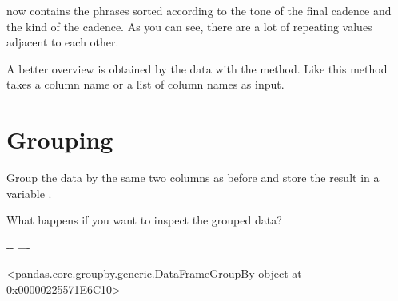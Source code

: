 \documentclass[letterpaper,10pt,english]{sphinxmanual}
\newlength\nbsphinxcodecellspacing
\begin{document}
 now contains the phrases sorted according to the tone of the final cadence and the kind of the cadence. As you can see, there are a lot of repeating values adjacent to each other.

A better overview is obtained by  the data with the  method. Like  this method takes a column name or a list of column names as input.


\section{Grouping}
\label{\detokenize{exercises/02_exercise:Grouping}}
Group the data by the same two columns as before and store the result in a variable .

{
\begin{sphinxVerbatim}[commandchars=\\\{\}]
\llap{\color{nbsphinxin}[24]:\,\hspace{\fboxrule}\hspace{\fboxsep}}  \PYG{p}{[} \PYG{p}{]}
\end{sphinxVerbatim}
}

What happens if you want to inspect the grouped data?

{
\begin{sphinxVerbatim}[commandchars=\\\{\}]
\llap{\color{nbsphinxin}[25]:\,\hspace{\fboxrule}\hspace{\fboxsep}}
\end{sphinxVerbatim}
}

{

\kern-\sphinxverbatimsmallskipamount\kern-\baselineskip
\kern+\FrameHeightAdjust\kern-\fboxrule
\vspace{\nbsphinxcodecellspacing}

\begin{sphinxVerbatim}[commandchars=\\\{\}]
\llap{\color{nbsphinxout}[25]:\,\hspace{\fboxrule}\hspace{\fboxsep}}<pandas.core.groupby.generic.DataFrameGroupBy object at 0x00000225571E6C10>
\end{sphinxVerbatim}
}
\end{document}
